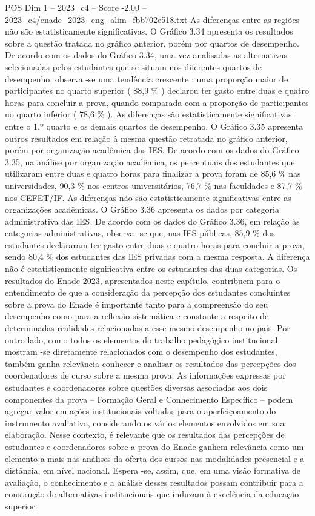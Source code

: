 \begin{textsample}{POS Dim 1 – 2023\_c4 – Score -2.00 – 2023\_c4/enade\_2023\_eng\_alim\_fbb702e518.txt}
As diferenças entre as regiões não são estatisticamente significativas.
O Gráfico 3.34 apresenta os resultados sobre a questão tratada no gráfico anterior, porém por quartos de desempenho.
De acordo com os dados do Gráfico 3.34, uma vez analisadas as alternativas selecionadas pelos estudantes que se situam nos diferentes quartos de desempenho, observa -se uma tendência crescente : uma proporção maior de participantes no quarto superior ( 88,9 \% ) declarou ter gasto entre duas e quatro horas para concluir a prova, quando comparada com a proporção de participantes no quarto inferior ( 78,6 \% ).
As diferenças são estatisticamente significativas entre o 1.º quarto e os demais quartos de desempenho.
O Gráfico 3.35 apresenta outros resultados em relação à mesma questão retratada no gráfico anterior, porém por organização acadêmica das IES.
De acordo com os dados do Gráfico 3.35, na análise por organização acadêmica, os percentuais dos estudantes que utilizaram entre duas e quatro horas para finalizar a prova foram de 85,6 \% nas universidades, 90,3 \% nos centros universitários, 76,7 \% nas faculdades e 87,7 \% nos CEFET/IF.
As diferenças não são estatisticamente significativas entre as organizações acadêmicas.
O Gráfico 3.36 apresenta os dados por categoria administrativa das IES.
De acordo com os dados do Gráfico 3.36, em relação às categorias administrativas, observa -se que, nas IES públicas, 85,9 \% dos estudantes declararam ter gasto entre duas e quatro horas para concluir a prova, sendo 80,4 \% dos estudantes das IES privadas com a mesma resposta.
A diferença não é estatisticamente significativa entre os estudantes das duas categorias.
Os resultados do Enade 2023, apresentados neste capítulo, contribuem para o entendimento de que a consideração da percepção dos estudantes concluintes sobre a prova do Enade é importante tanto para a compreensão do seu desempenho como para a reflexão sistemática e constante a respeito de determinadas realidades relacionadas a esse mesmo desempenho no país.
Por outro lado, como todos os elementos do trabalho pedagógico institucional mostram -se diretamente relacionados com o desempenho dos estudantes, também ganha relevância conhecer e analisar os resultados das percepções dos coordenadores de curso sobre a mesma prova.
As informações expressas por estudantes e coordenadores sobre questões diversas associadas aos dois componentes da prova – Formação Geral e Conhecimento Específico – podem agregar valor em ações institucionais voltadas para o aperfeiçoamento do instrumento avaliativo, considerando os vários elementos envolvidos em sua elaboração.
Nesse contexto, é relevante que os resultados das percepções de estudantes e coordenadores sobre a prova do Enade ganhem relevância como um elemento a mais nas análises da oferta dos cursos nas modalidades presencial e a distância, em nível nacional.
Espera -se, assim, que, em uma visão formativa de avaliação, o conhecimento e a análise desses resultados possam contribuir para a construção de alternativas institucionais que induzam à excelência da educação superior.

\end{textsample}
